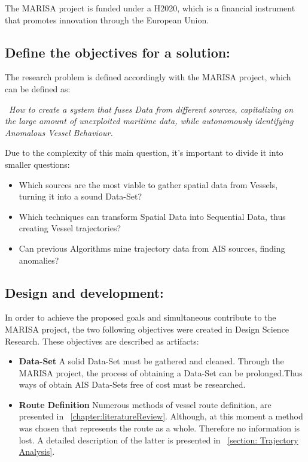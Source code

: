 The MARISA project is funded under a H2020, which is a financial instrument that promotes innovation through the European Union.

\subsection{Define the objectives for a solution:}
The research problem is defined accordingly with the MARISA project, which can be defined as: 

~\textit{How to create a system that fuses Data from different sources, capitalizing on the large amount of unexploited maritime data, while autonomously identifying Anomalous Vessel Behaviour.}  

Due to the complexity of this main question, it's important to divide it into smaller questions:

\begin{itemize}
\item Which sources are the most viable to gather spatial data from Vessels,
turning it into a sound Data-Set?
\item Which techniques can transform Spatial Data into Sequential Data, thus creating Vessel trajectories?
\item Can previous Algorithms mine trajectory data from AIS sources, finding anomalies?
\end{itemize}

\subsection{Design and development:} In order to achieve the proposed goals and simultaneous contribute to the MARISA project, the two following objectives were created in Design Science Research. These objectives are described as artifacts:

\begin{itemize}
\item \textbf{Data-Set} A solid Data-Set must be gathered and cleaned. Through the MARISA project, the process of obtaining a Data-Set can be prolonged.Thus ways of obtain AIS Data-Sets free of cost must be researched.

\item \textbf{Route Definition} Numerous methods of vessel route definition, are presented in ~\ref{chapter:literatureReview}.
Although, at this moment a method was chosen that represents the route as a whole. Therefore no information is lost. A detailed description of the latter is presented in ~\ref{section: Trajectory Analysis}.
\end{itemize}

